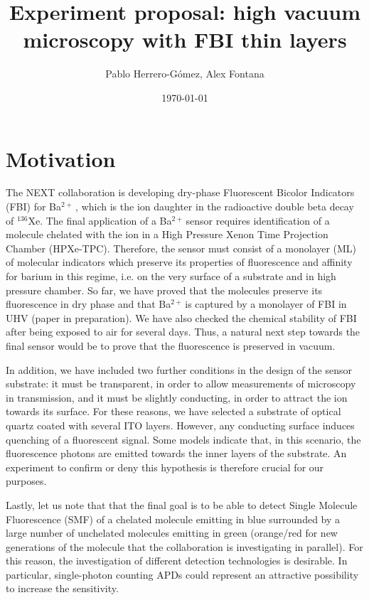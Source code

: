 \documentclass{article}
\title{Experiment proposal: high vacuum microscopy with FBI thin layers}
\author{Pablo Herrero-G\'omez, Alex Fontana}
\date{\today}
\def\Bapp{Ba$^{2+} \,$}
\begin{document}
\maketitle

\section{Motivation}

The NEXT collaboration is developing dry-phase Fluorescent Bicolor Indicators (FBI) for \Bapp, which is the ion daughter in the radioactive double beta decay of $^{136}$Xe. The final application of a \Bapp sensor requires identification of a molecule chelated with the ion in a High Pressure Xenon Time Projection Chamber (HPXe-TPC). Therefore, the sensor must consist of a monolayer (ML) of molecular indicators which preserve its properties of fluorescence and  affinity for barium in this regime, i.e. on the very surface of a substrate and in high pressure chamber. So far, we have proved that the molecules preserve its fluorescence in dry phase \cite{rivilla_fluorescent_2020} and that \Bapp is captured by a monolayer of FBI in UHV (paper in preparation). We have also checked the chemical stability of FBI after being exposed to air for several days. Thus, a natural next step towards the final sensor would be to prove that the fluorescence is preserved in vacuum.

In addition, we have included two further conditions in the design of the sensor substrate: it must be transparent, in order to allow measurements of microscopy in transmission, and it must be slightly conducting, in order to attract the ion towards its surface. For these reasons, we have selected a substrate of optical quartz coated with several ITO layers. However, any conducting surface induces quenching of a fluorescent signal. Some models indicate that, in this scenario, the fluorescence photons are emitted towards the inner layers of the substrate. An experiment to confirm or deny this hypothesis is therefore crucial for our purposes.

Lastly, let us note that that the final goal is to be able to detect Single Molecule Fluorescence (SMF) of a chelated molecule emitting in blue surrounded by a large number of unchelated molecules emitting in green (orange/red for new generations of the molecule that the collaboration is investigating in parallel). For this reason, the investigation of different detection technologies is desirable. In particular, single-photon counting APDs could represent an attractive possibility to increase the sensitivity.
\end{document}
